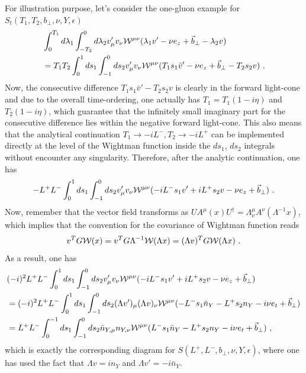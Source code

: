 \documentclass[a4paper,11pt]{article}
\begin{document}
For illustration purpose, let's consider the one-gluon example for $S_t(T_1,T_2,b_\perp,\nu,Y,\epsilon)$
\begin{align}
&\int_{0}^{T_1}d\lambda_1\int_{-T_2}^0d\lambda_2 v'_{\mu} v_{\nu} {\cal W}^{\mu \nu}(\lambda_1 v'-\nu e_z+\vec{b}_\perp-\lambda_2 v) \nonumber \\
&=T_1T_2\int_{0}^1 ds_1\int_{-1}^0ds_2 v'_{\mu} v_{\nu} {\cal W}^{\mu \nu}(T_1s_1 \bar v'-\nu e_z+\vec{b}_\perp-T_2s_2 v) \ .
\end{align}
Now, the consecutive difference $T_1s_1 \bar v'-T_2s_2 v$ is clearly in the forward light-cone and due to the overall time-ordering, one actually has $T_1=T_1(1-i\eta)$ and $T_2(1-i\eta)$, which guarantee that the infinitely small imaginary part for the consecutive difference lies within the negative forward light-cone.  This also means that the analytical continuation $T_1 \rightarrow -iL^{-}, T_2 \rightarrow -iL^+$ can be implemented directly at the level of the Wightman function inside the $ds_1$, $ds_2$ integrals without encounter any singularity.  Therefore, after the analytic continuation, one has
\begin{align}
-L^+L^-\int_{0}^1 ds_1\int_{-1}^0ds_2 v'_{\mu} v_{\nu} {\cal W}^{\mu \nu}(-iL^- s_1 v'+iL^+s_2 v-\nu e_z+\vec{b}_\perp) \ .
\end{align}
Now, remember that the vector field transforms as $UA^{\mu}(x)U^{\dagger}=\Lambda^{\mu}_{\nu}A^{\nu}(\Lambda^{-1}x)$, which implies that the convention for the covariance of Wightman function reads
\begin{align}
v^TG{\cal W}(x)=v^TG\Lambda^{-1}{\cal W}(\Lambda x)=(\Lambda v)^T G {\cal W}(\Lambda x) \ .
\end{align}
As a result, one has
\begin{align}
  &(-i)^2L^+L^-\int_{0}^1 ds_1\int_{-1}^0ds_2 v'_{\mu} v_{\nu} {\cal W}^{\mu \nu}(-iL^- s_1 v'+iL^+s_2 v-\nu e_z+\vec{b}_\perp) \nonumber \\
  &=(-i)^2L^+L^- \int_{0}^1 ds_1\int_{-1}^0ds_2 (\Lambda v')_{\mu} (\Lambda v)_{\nu}{\cal W}^{\mu \nu}(-L^- s_1 \bar n_Y-L^+s_2 n_Y-i\nu e_t+\vec{b}_\perp) \nonumber \\
  &=L^+L^- \int_{0}^{-1}ds_1\int_{-1}^0ds_2 \bar n_{Y,\mu} n_{Y,\nu} {\cal W}^{\mu \nu}(L^- s_1 \bar n_Y-L^+s_2 n_Y-i\nu e_t+\vec{b}_\perp)  \ ,
\end{align}
which is exactly the corresponding diagram for $S(L^+,L^-,b_\perp,\nu,Y,\epsilon)$, where one has used the fact that $\Lambda v= in_Y$ and $\Lambda v'=-i\bar n_Y$.
\end{document}
